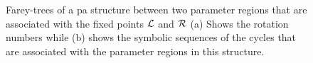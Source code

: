 \begin{figure}
{	}
	\qquad
	\caption[Farey-trees of a  structure between two parameter regions that are associated with the fixed points $\L$ and $\R$]{
		Farey-trees of a \gls{pa} structure between two parameter regions that are associated with the fixed points $\L$ and $\R$
		(a) Shows the rotation numbers while (b) shows the symbolic sequences of the cycles that are associated with the parameter regions in this structure.
	}
	\label{fig:state.discont.adding.farey}
\end{figure}
